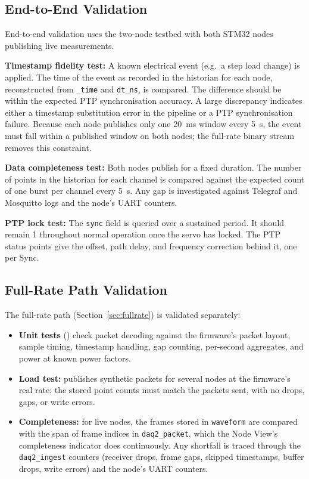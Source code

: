 \subsection{End-to-End Validation}
End-to-end validation uses the two-node testbed with both STM32 nodes publishing live measurements.

\textbf{Timestamp fidelity test:} A known electrical event (e.g.\ a step load change) is applied. The time of the event as recorded in the historian for each node, reconstructed from \texttt{\_time} and \texttt{dt\_ns}, is compared. The difference should be within the expected PTP synchronisation accuracy. A large discrepancy indicates either a timestamp substitution error in the pipeline or a PTP synchronisation failure. Because each node publishes only one 20~ms window every 5~s, the event must fall within a published window on both nodes; the full-rate binary stream removes this constraint.

\textbf{Data completeness test:} Both nodes publish for a fixed duration. The number of points in the historian for each channel is compared against the expected count of one burst per channel every 5~s. Any gap is investigated against Telegraf and Mosquitto logs and the node's UART counters.

\textbf{PTP lock test:} The \texttt{sync} field is queried over a sustained period. It should remain 1 throughout normal operation once the servo has locked. The PTP status points give the offset, path delay, and frequency correction behind it, one per Sync.

\subsection{Full-Rate Path Validation}
The full-rate path (Section~\ref{sec:fullrate}) is validated separately:
\begin{itemize}[noitemsep]
  \item \textbf{Unit tests} () check packet decoding against the firmware's packet layout, sample timing, timestamp handling, gap counting, per-second aggregates, and power at known power factors.
  \item \textbf{Load test:}  publishes synthetic packets for several nodes at the firmware's real rate; the stored point counts must match the packets sent, with no drops, gaps, or write errors.
  \item \textbf{Completeness:} for live nodes, the frames stored in \texttt{waveform} are compared with the span of frame indices in \texttt{daq2\_packet}, which the Node View's completeness indicator does continuously. Any shortfall is traced through the \texttt{daq2\_ingest} counters (receiver drops, frame gaps, skipped timestamps, buffer drops, write errors) and the node's UART counters.
\end{itemize}


